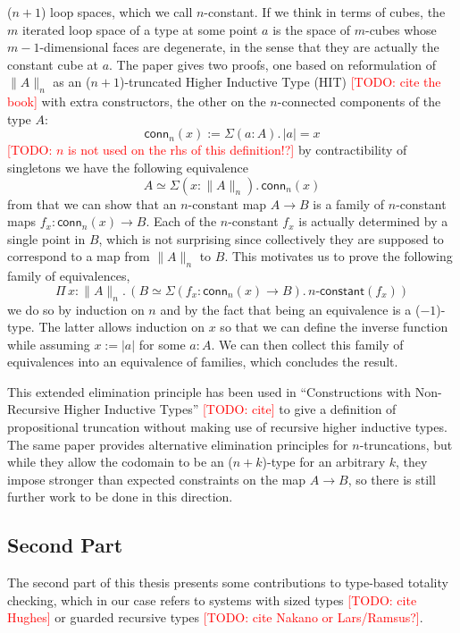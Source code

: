 \documentclass{book}
\newcommand{\TODO}[1]{\textcolor{red}{[TODO: #1]}}
\newcommand{\tr}[2]{\| #2 \|_{#1}}
\newcommand{\trcon}[1]{| #1 |}
\newcommand{\conn}{\mathsf{conn}}
\newcommand{\sd}{.\,}
\begin{document}
($n{+}1$) loop spaces, which we call $n$-constant.
If we think in terms of cubes, the $m$ iterated loop space of a type at some point $a$
is the space of $m$-cubes whose $m{-}1$-dimensional faces are
degenerate, in the sense that they are actually the constant cube at $a$.
The paper gives two proofs, one based on reformulation of $\tr{n}{A}$
as an ($n{+}1$)-truncated Higher Inductive Type (HIT) \TODO{cite the book}
with extra constructors, the other on the
$n$-connected components of the type $A$:
\[
\conn_n(x) := \Sigma (a : A)\sd \trcon{a} = x
\]
\TODO{$n$ is not used on the rhs of this definition!?}
by contractibility of singletons we have the following equivalence
\[
A \simeq \Sigma (x : \tr{n}{A})\sd \conn_n(x)
\]
from that we can show that an $n$-constant map $A \to B$ is a family of $n$-constant
maps $f_x : \conn_n(x) \to B$. Each of the $n$-constant $f_x$ is actually
determined by a single point in $B$, which is not surprising since
collectively they are supposed to correspond to a map from
$\tr{n}{A}$ to $B$. This motivates us to prove the following family of equivalences,
\[
\Pi\,x : \tr{n}{A}\sd (B \simeq \Sigma (f_x : \conn_n(x) \to B)\sd\textsf{$n$-constant}(f_x))
\]
we do so by induction on $n$ and by the fact that being an equivalence
is a ($-1$)-type. The latter allows induction on $x$ so that we can
define the inverse function while assuming $x := \trcon{a}$ for some
$a : A$.
We can then collect this
family of equivalences into an equivalence of families, which
concludes the result.

This extended elimination principle has been used in ``Constructions
with Non-Recursive Higher Inductive Types'' \TODO{cite} to give a
definition of propositional truncation without making use of recursive
higher inductive types. The same paper provides alternative
elimination principles for $n$-truncations, but while they allow the
codomain to be an ($n{+}k$)-type for an arbitrary $k$, they impose
stronger than expected constraints on the map $A \to B$, so there is
still further work to be done in this direction.



\subsection{Second Part}

The second part of this thesis presents some contributions to
type-based totality checking, which in our case refers to systems with
sized types \TODO{cite Hughes} or guarded recursive types \TODO{cite
  Nakano or Lars/Ramsus?}.
\end{document}
